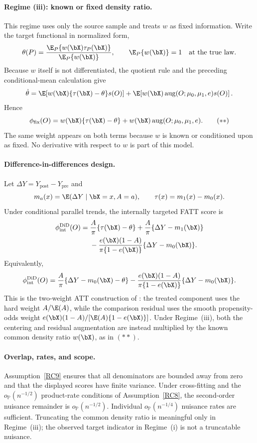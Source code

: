\documentclass{article}
\renewcommand{\P}{\mathbb{P}}
\begin{document}
\paragraph{Regime (iii): known or fixed density ratio.}
This regime uses only the source sample and treats $w$ as fixed information. Write the target functional in normalized form,
\[
\theta(P)
=
\frac{\E_P\{w(\bX)\tau_P(\bX)\}}
     {\E_P\{w(\bX)\}},
\qquad
\E_P\{w(\bX)\}=1
\quad\text{at the true law}.
\]
Because $w$ itself is not differentiated, the quotient rule and the preceding conditional-mean calculation give
\[
\dot\theta
=
\E\!\left[
w(\bX)\{\tau(\bX)-\theta\}s(O)
\right]
+
\E\!\left[
w(\bX)\operatorname{aug}(O;\mu_0,\mu_1,e)s(O)
\right].
\]
Hence
\[
\phi_{\mathrm{fix}}(O)
=
w(\bX)\{\tau(\bX)-\theta\}
+
w(\bX)\operatorname{aug}(O;\mu_0,\mu_1,e).
\tag{$\ast\ast$}
\]
The same weight appears on both terms because $w$ is known or conditioned upon as fixed. No derivative with respect to $w$ is part of this model.

\paragraph{Difference-in-differences design.}
Let $\Delta Y=Y_{\mathrm{post}}-Y_{\mathrm{pre}}$ and
\[
m_a(x)=\E(\Delta Y\mid\bX=x,A=a),
\qquad
\tau(x)=m_1(x)-m_0(x).
\]
Under conditional parallel trends, the internally targeted FATT score is
\begin{align*}
\phi_{\mathrm{int}}^{\mathrm{DiD}}(O)
={}&
\frac{A}{\pi}\{\tau(\bX)-\theta\}
+
\frac{A}{\pi}\{\Delta Y-m_1(\bX)\}\\
&-
\frac{e(\bX)(1-A)}
     {\pi\{1-e(\bX)\}}
\{\Delta Y-m_0(\bX)\}.
\end{align*}
Equivalently,
\[
\phi_{\mathrm{int}}^{\mathrm{DiD}}(O)
=
\frac{A}{\pi}
\{\Delta Y-m_0(\bX)-\theta\}
-
\frac{e(\bX)(1-A)}
     {\pi\{1-e(\bX)\}}
\{\Delta Y-m_0(\bX)\}.
\]
This is the two-weight ATT construction of
\citet{santannaDoublyRobustDifferenceindifferences2020}: the treated component uses the hard weight $A/\E(A)$, while the comparison residual uses the smooth propensity-odds weight
$e(\bX)(1-A)/[\E(A)\{1-e(\bX)\}]$.
Under Regime~(iii), both the centering and residual augmentation are instead multiplied by the known common density ratio $w(\bX)$, as in $(\ast\ast)$.

\paragraph{Overlap, rates, and scope.}
Assumption~\ref{RC9} ensures that all denominators are bounded away from zero and that the displayed scores have finite variance. Under cross-fitting and the $o_{\P}(n^{-1/2})$ product-rate conditions of Assumption~\ref{RC8}, the second-order nuisance remainder is $o_{\P}(n^{-1/2})$. Individual $o_{\P}(n^{-1/4})$ nuisance rates are sufficient. Truncating the common density ratio is meaningful only in Regime~(iii); the observed target indicator in Regime~(i) is not a truncatable nuisance.
\end{document}
